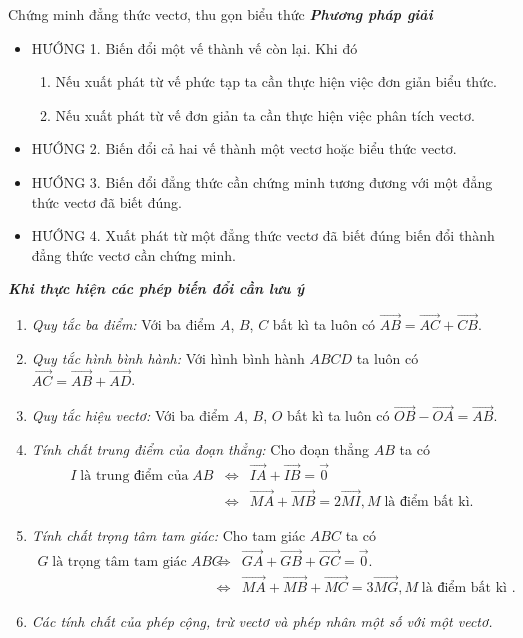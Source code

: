\begin{dang}%
	{Chứng minh đẳng thức vectơ, thu gọn biểu thức}
	\textbf{\textit{Phương pháp giải}}
	\begin{itemize}
		\item HƯỚNG 1. Biến đổi một vế thành vế còn lại. Khi đó
		\begin{enumerate}
			\item Nếu xuất phát từ vế phức tạp ta cần thực hiện việc đơn giản biểu thức.
			\item Nếu xuất phát từ vế đơn giản ta cần thực hiện việc phân tích vectơ.
		\end{enumerate}
		\item HƯỚNG 2. Biến đổi cả hai vế thành một vectơ hoặc biểu thức vectơ.
		\item HƯỚNG 3. Biến đổi đẳng thức cần chứng minh tương đương với  một đẳng thức vectơ đã biết đúng.
		\item HƯỚNG 4. Xuất phát từ một đẳng thức vectơ đã biết đúng biến đổi thành đẳng thức vectơ cần chứng minh.
	\end{itemize}
	\textit{\textbf{Khi thực hiện các phép biến đổi cần lưu ý}}
	\begin{enumerate}
		\item \textit{Quy tắc ba điểm:} Với ba điểm $A$, $B$, $C$ bất kì ta luôn có 
		$ \overrightarrow {AB}= \overrightarrow {AC}  +  \overrightarrow{CB}$.
		\item \textit{Quy tắc hình bình hành:} Với hình bình hành $ABCD$ ta luôn có 
		$ \overrightarrow {AC}= \overrightarrow {AB}  +  \overrightarrow{A D}$.
		\item \textit{Quy tắc hiệu vectơ:} Với ba điểm $A$, $B$, $O$ bất kì ta luôn có 
		$ \overrightarrow {OB} -  \overrightarrow{OA}= \overrightarrow {AB}$.
		\item \textit{Tính chất trung điểm của đoạn thẳng:} Cho đoạn thẳng $AB$ ta 
		có
		\allowdisplaybreaks
		\begin{eqnarray*}
			I\;\text{là trung điểm của}\;AB&\Leftrightarrow& 
			\overrightarrow {IA} + \overrightarrow{IB}= \overrightarrow {0}\\
			&\Leftrightarrow&
			\overrightarrow {MA}  +  \overrightarrow{MB}=2\overrightarrow{MI}, M \;\text{là điểm bất kì}.
		\end{eqnarray*}
		\item \textit{Tính chất trọng tâm tam giác:} Cho tam giác $ABC$ ta có
		\allowdisplaybreaks
		\begin{eqnarray*}
			G\;\text{là trọng tâm tam giác}\; ABC &\Leftrightarrow&
			\overrightarrow {GA}  +  \overrightarrow{GB}  +  \overrightarrow{GC}= \overrightarrow {0}.\\
			&\Leftrightarrow& \overrightarrow {MA}  +  \overrightarrow{MB}  +  \overrightarrow{MC}=3 \overrightarrow {MG}, M\;\text{là điểm bất kì }.
		\end{eqnarray*}		
		\item \textit{Các tính chất của phép cộng, trừ vectơ và phép nhân một số với một vectơ.}
	\end{enumerate} 
\end{dang}
